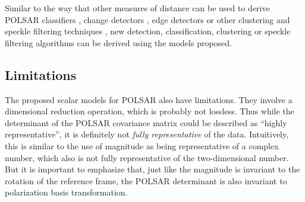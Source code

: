 Similar to the way that other measures of distance can be used to derive POLSAR classifiers \cite{Lee_1999_TGRS}, change detectors \cite{Conradsen_2003_TGRS_4}, edge detectors \cite{Schou_2003_TGRS_20} or other clustering and speckle filtering techniques \cite{Le_2010_ACRS} \cite{Le_2011_ACRS}, 
new detection, classification, clustering or speckle filtering algorithms can be derived using the models proposed.


\subsection{Limitations}


The
                proposed scalar models for POLSAR also have limitations.
They
                involve a dimensional reduction operation, which is
                probably not lossless.
Thus
                while the determinant of the POLSAR covariance matrix could be described as
                ``highly representative'', it is definitely not
                \textit{fully representative} of the data.
Intuitively,
                this is similar to the use of magnitude as being
                representative of a complex number, which also is not
                fully representative of the two-dimensional number.
But it is important to emphasize that,
                just like the magnitude is invariant to the rotation of
                the reference frame, the POLSAR determinant is also
                invariant to polarization basis transformation.

